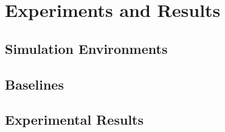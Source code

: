 \chapter{Experiments and Results}
\label{text:experiments}

\section{Simulation Environments}
\label{text:experiments/environments}

\section{Baselines}
\label{text:experiments/baselines}

\section{Experimental Results}
\label{text:experiments/results}